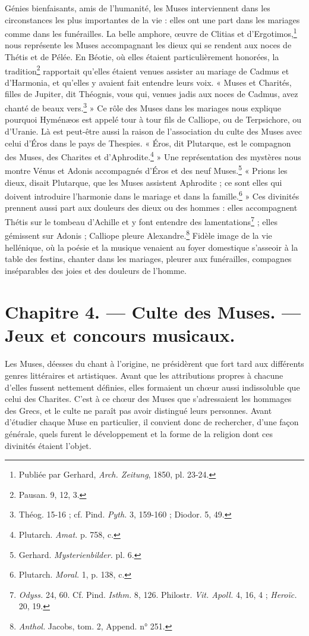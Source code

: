 \documentclass[a4paper, 11pt, oneside, polutonikogreek, french]{article}
\begin{document}
Génies bienfaisants, amis de l'humanité, les Muses interviennent dans les circonstances les plus importantes de la vie : elles ont une part dans les mariages comme dans les funérailles. La belle amphore, œuvre de Clitias et d'Ergotimos,\footnote{Publiée par Gerhard, \emph{Arch. Zeitung}, 1850, pl. 23-24.} nous représente les Muses accompagnant les dieux qui se rendent aux noces de Thétis et de Pélée. En Béotie, où elles étaient particulièrement honorées, la tradition\footnote{Pausan. 9, 12, 3.} rapportait qu'elles étaient venues assister au mariage de Cadmus et d'Harmonia, et qu'elles y avaient fait entendre leurs voix. « Muses et Charités, filles de Jupiter, dit Théognis, vous qui, venues jadis aux noces de Cadmus, avez chanté de beaux vers.\footnote{Théog. 15-16 ; cf. Pind. \emph{Pyth.} 3, 159-160 ; Diodor. 5, 49.} » Ce rôle des Muses dans les mariages nous explique pourquoi Hyménæos est appelé tour à tour fils de Calliope, ou de Terpsichore, ou d'Uranie. Là est peut-être aussi la raison de l'association du culte des Muses avec celui d'Éros dans le pays de Thespies. « Éros, dit Plutarque, est le compagnon des Muses, des Charites et d'Aphrodite.\footnote{Plutarch. \emph{Amat.} p. 758, c.} » Une représentation des mystères nous montre Vénus et Adonis accompagnés d'Éros et des neuf Muses.\footnote{Gerhard. \emph{Mysterienbilder.} pl. 6.} « Prions les dieux, disait Plutarque, que les Muses assistent Aphrodite ; ce sont elles qui doivent introduire l'harmonie dans le mariage et dans la famille.\footnote{Plutarch. \emph{Moral.} 1, p. 138, c.} » Ces divinités prennent aussi part aux douleurs des dieux ou des hommes : elles accompagnent Thétis sur le tombeau d'Achille et y font entendre des lamentations\footnote{\emph{Odyss.} 24, 60. Cf. Pind. \emph{Isthm.} 8, 126. Philostr. \emph{Vit. Apoll.} 4, 16, 4 ; \emph{Heroïc.} 20, 19.} ; elles gémissent sur Adonis ; Calliope pleure Alexandre.\footnote{\emph{Anthol.} Jacobs, tom. 2, Append. n° 251.} Fidèle image de la vie hellénique, où la poésie et la musique venaient au foyer domestique s'asseoir à la table des festins, chanter dans les mariages, pleurer aux funérailles, compagnes inséparables des joies et des douleurs de l'homme.
\clearpage
\section{Chapitre 4. --- Culte des Muses. --- Jeux et concours musicaux.}
\paragraph{}
Les Muses, déesses du chant à l'origine, ne présidèrent que fort tard aux différents genres littéraires et artistiques. Avant que les attributions propres à chacune d'elles fussent nettement définies, elles formaient un chœur aussi indissoluble que celui des Charites. C'est à ce chœur des Muses que s'adressaient les hommages des Grecs, et le culte ne paraît pas avoir distingué leurs personnes. Avant d'étudier chaque Muse en particulier, il convient donc de rechercher, d'une façon générale, quels furent le développement et la forme de la religion dont ces divinités étaient l'objet.
\end{document}
